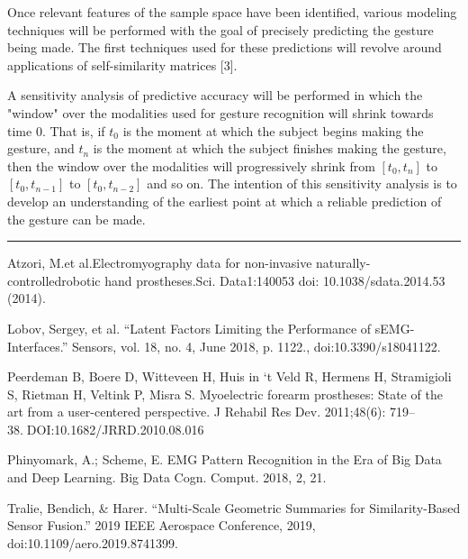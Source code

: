 \documentclass[11pt]{article}
\begin{document}
Once relevant features of the sample space have been identified, various modeling techniques will be performed with the goal of precisely predicting the gesture being made. The first techniques used for these predictions will revolve around applications of self-similarity matrices [3].

A sensitivity analysis of predictive accuracy will be performed in which the "window" over the modalities used for gesture recognition will shrink towards time $0$. That is, if $t_0$ is the moment at which the subject begins making the gesture, and $t_n$ is the moment at which the subject finishes making the gesture, then the window over the modalities will progressively shrink from $[t_0, t_n]$ to $[t_0, t_{n-1}]$ to $[t_0, t_{n-2}]$ and so on. The intention of this sensitivity analysis is to develop an understanding of the earliest point at which a reliable prediction of the gesture can be made.
\begin{center}
\noindent\rule{16cm}{0.4pt}
\end{center}


\begin{thebibliography}{5}

 Atzori, M.et al.Electromyography data for non-invasive naturally-controlledrobotic hand prostheses.Sci. Data1:140053 doi: 10.1038/sdata.2014.53 (2014).

 Lobov, Sergey, et al. “Latent Factors Limiting the Performance of sEMG-Interfaces.” Sensors, vol. 18, no. 4, June 2018, p. 1122., doi:10.3390/s18041122.

 Peerdeman  B,  Boere  D,  Witteveen  H,  Huis  in  ‘t  Veld  R,  Hermens H, Stramigioli S, Rietman H, Veltink P, Misra S. Myoelectric  forearm  prostheses:  State  of  the  art  from  a  user-centered perspective. J Rehabil Res Dev. 2011;48(6): 719–38.DOI:10.1682/JRRD.2010.08.016

 Phinyomark, A.; Scheme, E. EMG Pattern Recognition in the Era of Big Data and Deep Learning. Big Data Cogn. Comput. 2018, 2, 21. 

 Tralie, Bendich, \& Harer. “Multi-Scale Geometric Summaries for Similarity-Based Sensor Fusion.” 2019 IEEE Aerospace Conference, 2019, doi:10.1109/aero.2019.8741399.

\end{thebibliography}
  
\end{document}
